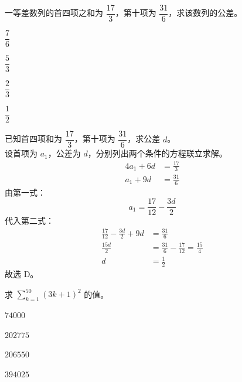 \documentclass[12pt,a4paper]{exam-zh}
\begin{document}
\begin{question}
    一等差数列的首四项之和为 $\dfrac{17}{3}$，第十项为 $\dfrac{31}{6}$，求该数列的公差。\paren[D]
    \begin{choices}
        \item $\dfrac{7}{6}$
        \item $\dfrac{5}{3}$
        \item $\dfrac{2}{3}$
        \item $\dfrac{1}{2}$
    \end{choices}
\end{question}

\begin{solution}
    已知首四项和为 $\dfrac{17}{3}$，第十项为 $\dfrac{31}{6}$，求公差 $d$。 \\
    设首项为 $a_{1}$，公差为 $d$，分别列出两个条件的方程联立求解。
    \begin{align*}
        4a_{1}+6d &= \frac{17}{3} \\
        a_{1}+9d &= \frac{31}{6}
    \end{align*}
    由第一式：
    \[
        a_{1} = \frac{17}{12}-\frac{3d}{2}
    \]
    代入第二式：
    \begin{align*}
        \frac{17}{12}-\frac{3d}{2}+9d &= \frac{31}{6} \\
        \frac{15d}{2} &= \frac{31}{6}-\frac{17}{12} = \frac{15}{4} \\
        d &= \frac{1}{2}
    \end{align*}
    故选 D。
\end{solution}

\begin{question}
    求 $\displaystyle\sum_{k=1}^{50}(3k+1)^{2}$ 的值。\paren[D]
    \begin{choices}
        \item $74000$
        \item $202775$
        \item $206550$
        \item $394025$
    \end{choices}
\end{question}
\end{document}
